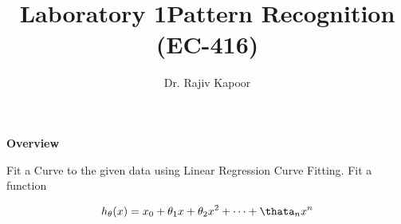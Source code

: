 \documentclass{homeworg}
\title{Laboratory 1}
\title{Pattern Recognition (EC-416)}
\author{Dr. Rajiv Kapoor}
\begin{document}
\maketitle

\textbf{Overview}

Fit a Curve to the given data using Linear Regression Curve Fitting. Fit a function

$$
h_{\theta}(x) = x_0 + \theta_1 x + \theta_2 x^2 + \cdots + {\thata}_n x^n 
$$
\end{document}
